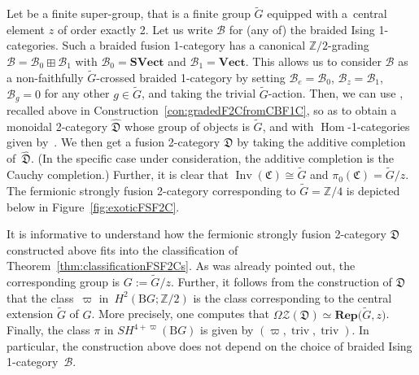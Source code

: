 \documentclass[10pt,a4paper]{amsart}
\numberwithin{equation}{section}
\begin{document}
\begin{Example}\label{ex:actionandextension}
Let  be a finite super-group, that is a finite group $\widetilde{G}$ equipped with a~central element $z$ of order exactly 2. Let us write $\mathcal{B}$ for (any of) the braided Ising 1-categories. Such a braided fusion 1-category has a canonical $\mathbb{Z}/2$-grading $\mathcal{B}=\mathcal{B}_0\boxplus \mathcal{B}_1$ with $\mathcal{B}_0=\mathbf{SVect}$ and $\mathcal{B}_1=\mathbf{Vect}$. This allows us to consider $\mathcal{B}$ as a non-faithfully $\widetilde{G}$-crossed braided 1-category by setting $\mathcal{B}_e=\mathcal{B}_0$, $\mathcal{B}_z=\mathcal{B}_1$, $\mathcal{B}_g=0$ for any other $g\in\widetilde{G}$, and taking the trivial $\widetilde{G}$-action. Then, we can use \cite[Construction~2.1.23]{DR}, recalled above in Construction~\ref{con:gradedF2CfromCBF1C}, so as to obtain a monoidal 2-category $\widehat{\mathfrak{D}}$ whose group of objects is $\widetilde{G}$, and with $\operatorname{Hom}$-1-categories given by~. We then get a fusion 2-category $\mathfrak{D}$ by taking the additive completion of~$\widehat{\mathfrak{D}}$. (In the specific case under consideration, the additive completion is the Cauchy completion.) Further, it is clear that $\operatorname{Inv}(\mathfrak{C})\cong \widetilde{G}$ and $\pi_0(\mathfrak{C})=\widetilde{G}/z$. The fermionic strongly fusion 2-category corresponding to $\widetilde{G}=\mathbb{Z}/4$ is depicted below in Figure~\ref{fig:exoticFSF2C}.

It is informative to understand how the fermionic strongly fusion 2-category $\mathfrak{D}$ constructed above fits into the classification of Theorem~\ref{thm:classificationFSF2Cs}. As was already pointed out, the corresponding group is $G:=\widetilde{G}/z$. Further, it follows from the construction of $\mathfrak{D}$ that the class~$\varpi$ in~$H^2(\mathrm{B}G;\mathbb{Z}/2)$ is the class corresponding to the central extension $\widetilde{G}$ of $G$. More precisely, one computes that $\Omega\mathscr{Z}(\mathfrak{D})\simeq\mathbf{Rep}\big(\widetilde{G},z\big)$. Finally, the class $\pi$ in $SH^{4+\varpi}(\mathrm{B}G)$ is given by $(\varpi, \operatorname{triv}, \operatorname{triv})$. In particular, the construction above does not depend on the choice of braided Ising 1-category~$\mathcal{B}$.
\end{Example}
\end{document}
